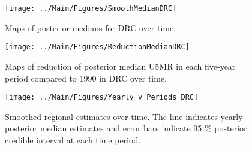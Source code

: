 \documentclass[12pt]{article}\usepackage[]{graphicx}\usepackage[]{color}
\newenvironment{knitrout}{}{} %
\begin{document}
\begin{knitrout}
\color{fgcolor}\begin{figure}[bht]

{\centering \texttt{[image: ../Main/Figures/SmoothMedianDRC]} 

}

\caption[Maps of posterior medians for DRC  over time]{Maps of posterior medians for DRC  over time.}\label{fig:unnamed-chunk-94}
\end{figure}


\end{knitrout}
\begin{knitrout}
\color{fgcolor}\begin{figure}[bht]

{\centering \texttt{[image: ../Main/Figures/ReductionMedianDRC]} 

}

\caption[Maps of reduction of posterior median U5MR in each five-year period compared to 1990 in DRC over time]{Maps of reduction of posterior median U5MR in each five-year period compared to 1990 in DRC over time.}\label{fig:unnamed-chunk-95}
\end{figure}


\end{knitrout}
\begin{knitrout}
\color{fgcolor}\begin{figure}[bht]

{\centering \texttt{[image: ../Main/Figures/Yearly\_v\_Periods\_DRC]} 

}

\caption[Smoothed regional estimates over time]{Smoothed regional estimates over time. The line indicates yearly posterior median estimates and error bars indicate 95 \% posterior credible interval at each time period.}\label{fig:unnamed-chunk-96}
\end{figure}


\end{knitrout}
\end{document}
